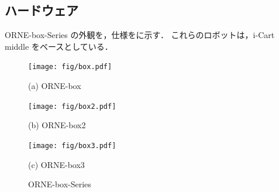 \documentclass[twocolumn, 9pt]{jsproceedings}
\begin{document}
\subsection{ハードウェア}
ORNE-box-Series の外観を，仕様をに示す．
これらのロボットは，i-Cart middle\cite{icart} をベースとしている．

\begin{figure}[h]
  \centering
  \begin{minipage}[b]{0.3\linewidth}
    \centering
    \texttt{[image: fig/box.pdf]}
    \caption*{(a) ORNE-box}
  \end{minipage} 
  \hspace{-1.2mm}
  \begin{minipage}[b]{0.3\linewidth}
    \centering
    \texttt{[image: fig/box2.pdf]}
    \caption*{(b) ORNE-box2}
  \end{minipage}
  \begin{minipage}[b]{0.3\linewidth}
    \centering
    \texttt{[image: fig/box3.pdf]}
    \caption*{(c) ORNE-box3}
  \end{minipage}
  \caption{ORNE-box-Series}
  \label{fig:orne-series}
\end{figure}

\vspace*{-4mm}
\end{document}
